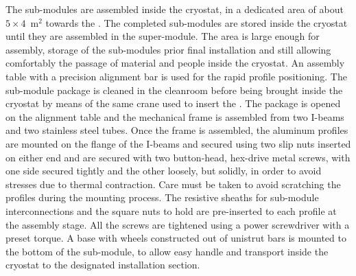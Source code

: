 The  sub-modules are assembled inside the  cryostat, in a dedicated area of about $5 \times 4$~m$^2$ towards the .
The completed sub-modules are stored inside the cryostat until they are assembled in the super-module.
The area is large enough for assembly, storage of the sub-modules prior final installation and still allowing comfortably the passage of material and people inside the cryostat.
An assembly table with a precision alignment bar is used for the rapid profile positioning.
The sub-module package is cleaned in the cleanroom before being brought inside the cryostat by means of the same crane used to insert the .
The package is opened on the alignment table and the mechanical frame is assembled from two  I-beams and two stainless steel tubes.
Once the frame is assembled, the aluminum profiles are mounted on the flange of the  I-beams and secured using two slip nuts inserted on either end and are secured with two button-head, hex-drive metal screws, with one side secured tightly and the other loosely, but solidly, in order to avoid stresses due to thermal contraction.
Care must be taken to avoid scratching the profiles during the mounting process.
The resistive sheaths for sub-module interconnections and the square nuts to hold  are pre-inserted to each profile at the assembly stage.
All the screws are tightened using a power screwdriver with a preset torque.
A base with wheels constructed out of unistrut bars is mounted to the bottom of the sub-module, to allow easy handle and transport inside the cryostat to the designated installation section.

